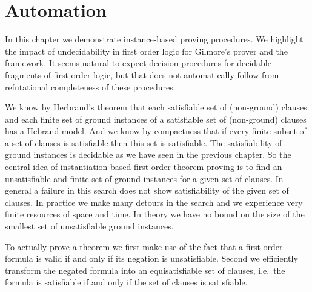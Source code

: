 
\chapter{Automation}



In this chapter we demonstrate instance-based proving procedures.
We highlight the impact of undecidability in first order logic
for Gilmore's prover and the \InstGen framework.
It seems natural to expect decision procedures for decidable fragments of first order logic,
but that does not automatically follow from refutational completeness of these procedures.


%
We know by Herbrand's theorem 
that each satisfiable set of (non-ground) clauses
and each finite set of ground instances of a satisfiable set of (non-ground) clauses
has a Hebrand model. 
And we know by compactness 
that if every finite subset of a set of clauses is satisfiable then this set is satisfiable.
The satisfiability of ground instances is decidable as we have seen in the previous chapter.
So the central idea of instantiation-based first order theorem proving 
is to find an unsatisfiable and finite set of ground instances for a given set of clauses.
In general a failure in this search does not show satisfiability of the given set of clauses.
In practice we make many detours in the search and we experience very finite resources of space and time. 
In theory we have no bound on the size of the smallest set of unsatisfiable ground instances.



To actually prove a theorem 
we first make use of the fact that a first-order formula is valid if and only if its negation is unsatisfiable.
Second we efficiently transform the negated formula into an {\myem equisatisfiable} set of clauses,
i.e.~the formula is satisfiable if and only if the set of clauses is satisfiable.

